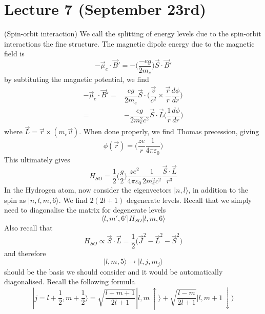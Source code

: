\section{Lecture 7 (September 23rd)}
\begin{defi}
(Spin-orbit interaction) We call the splitting of energy levels due to the spin-orbit interactions the fine structure. The magnetic dipole energy due to the magnetic field is
\[-\vec{\mu }_{e}\cdot \vec{B}'=-\Big(\dfrac{-e g}{2m_{e}}\Big)\vec{S}\cdot \vec{B}'\]
by subtituting the magnetic potential, we find
\[\begin{align*}
-\vec{\mu }_{e}\cdot \vec{B}'=&\dfrac{eg}{2m_{e}}\vec{S}\cdot \Big(\dfrac{\vec{v}}{c^2}\times \dfrac{\vec{r}}{r}\dfrac{d \phi }{d r} \Big)\\
=&-\dfrac{eg}{2m_{e}^2c^2}\vec{S}\cdot \vec{L}\Big(\dfrac{1}{r}\dfrac{d \phi }{d r} \Big)
\end{align*}\]
where $\vec{L}=\vec{r}\times (m_{e}\vec{v})$. When done properly, we find Thomas precession, giving
\[\phi (\vec{r})=\Big(\dfrac{ze}{r}\dfrac{1}{4\pi \varepsilon _{0}}\Big)\]
This ultimately gives
\[H_{SO}=\dfrac{1}{2}\Big(\dfrac{g}{2}\Big)\dfrac{ze^2}{4\pi \varepsilon _{0}}\dfrac{1}{2m_{e}^2c^2}\dfrac{\vec{S}\cdot \vec{L}}{r^3}\]
In the Hydrogen atom, now consider the eigenvectors $|n,l\rangle $, in addition to the spin as $|n,l,m,6\rangle $. We find $2(2l+1)$ degenerate levels. Recall that we simply need to diagonalise the matrix for degenerate levels
\[\langle l,m',6'|H_{SO}|l,m,6\rangle \]
Also recall that
\[H_{SO}\propto \vec{S}\cdot \vec{L}=\dfrac{1}{2}\Big(\vec{J}^2-\vec{L}^2-\vec{S}^2\Big)\]
and therefore 
\[|l,m,5\rangle \rightarrow |l,j,m_{j}\rangle \]
should be the basis we should consider and it would be automatically diagonalised. Recall the following formula
\[|j=l+\dfrac{1}{2},m+\dfrac{1}{2}\rangle =\sqrt{\dfrac{l+m+1}{2l+1}}|l,m\,\uparrow\rangle +\sqrt{\dfrac{l-m}{2l+1}}|l,m+1\,\downarrow\rangle \]

\end{defi}
\vspace{2ex}

